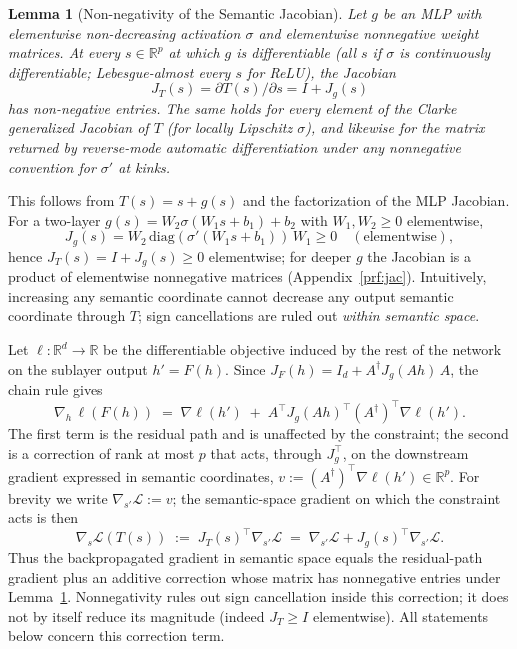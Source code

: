 \documentclass{article}
\theoremstyle{plain}
\newtheorem{lemma}[theorem]{Lemma}
\theoremstyle{definition}
\theoremstyle{remark}
\begin{document}
\begin{lemma}[Non-negativity of the Semantic Jacobian]
\label{lem:jacobian-nonneg}
Let $g$ be an MLP with elementwise non-decreasing activation $\sigma$ and
elementwise nonnegative weight matrices. At every $s \in \mathbb{R}^p$ at which $g$
is differentiable (all $s$ if $\sigma$ is continuously differentiable;
Lebesgue-almost every $s$ for ReLU), the Jacobian
\[
J_T(s) = \partial T(s)/\partial s = I + J_g(s)
\]
has non-negative entries. The same holds for every element of the Clarke
generalized Jacobian of $T$ (for locally Lipschitz $\sigma$), and likewise for the
matrix returned by reverse-mode automatic differentiation under any nonnegative
convention for $\sigma'$ at kinks.
\end{lemma}

This follows from $T(s)=s+g(s)$ and the factorization of the MLP Jacobian. For a
two-layer $g(s)=W_2\sigma(W_1 s + b_1)+b_2$ with $W_1,W_2\ge 0$ elementwise,
\[
J_g(s)=W_2\,\mathrm{diag}(\sigma'(W_1 s+b_1))\,W_1 \ge 0 \quad (\text{elementwise}),
\]
hence $J_T(s)=I + J_g(s)\ge 0$ elementwise; for deeper $g$ the Jacobian is a product
of elementwise nonnegative matrices (Appendix~\ref{prf:jac}). %
Intuitively, increasing any semantic coordinate cannot decrease any output semantic
coordinate through $T$; sign cancellations are ruled out \emph{within semantic space}.

Let $\ell:\mathbb{R}^d\to\mathbb{R}$ be the differentiable objective induced by the
rest of the network on the sublayer output $h' = F(h)$. Since
$J_F(h) = I_d + A^\dagger J_g(Ah)\, A$, the chain rule gives
\[
\nabla_h\, \ell(F(h)) \;=\; \nabla \ell(h') \;+\; A^{\top} J_g(Ah)^{\top} (A^\dagger)^{\top} \nabla \ell(h').
\]
The first term is the residual path and is unaffected by the constraint; the second
is a correction of rank at most $p$ that acts, through $J_g^\top$, on the downstream
gradient expressed in semantic coordinates, $v := (A^\dagger)^{\top}\nabla \ell(h')
\in \mathbb{R}^p$. For brevity we write $\nabla_{s'}\mathcal{L} := v$; the
semantic-space gradient on which the constraint acts is then
\[
\nabla_s \mathcal{L}(T(s)) \;:=\; J_T(s)^\top \nabla_{s'} \mathcal{L}
\;=\; \nabla_{s'}\mathcal{L} + J_g(s)^\top \nabla_{s'}\mathcal{L}.
\]
Thus the backpropagated gradient in semantic space equals the residual-path gradient
plus an additive correction whose matrix has nonnegative entries under
Lemma~\ref{lem:jacobian-nonneg}. Nonnegativity rules out sign cancellation inside
this correction; it does not by itself reduce its magnitude (indeed $J_T \ge I$
elementwise). All statements below concern this correction term.
\end{document}
